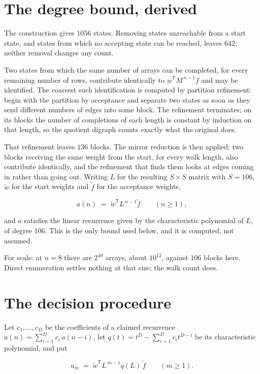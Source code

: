 \documentclass[11pt]{article}
\theoremstyle{definition}
\begin{document}
\section{The degree bound, derived}

The construction gives $1056$ states. Removing states unreachable from a start state, and states from which no accepting state can be reached, leaves $642$; neither removal changes any count.

Two states from which the same number of arrays can be completed, for every remaining number of rows, contribute identically to $w^{\mathsf T}M^{\,n-1}f$ and may be identified. The coarsest such identification is computed by partition refinement: begin with the partition by acceptance and separate two states as soon as they send different numbers of edges into some block. The refinement terminates; on its blocks the number of completions of each length is constant by induction on that length, so the quotient digraph counts exactly what the original does.

That refinement leaves $136$ blocks. The mirror reduction is then applied: two blocks receiving the same weight from the start, for every walk length, also contribute identically, and the refinement that finds them looks at edges coming in rather than going out. Writing $L$ for the resulting $S \times S$ matrix with $S = 106$, $\tilde w$ for the start weights and $\tilde f$ for the acceptance weights,

\[a(n) \;=\; \tilde w^{\mathsf T} L^{\,n-1} \tilde f \qquad (n \ge 1),\]

and $a$ satisfies the linear recurrence given by the characteristic polynomial of $L$, of degree $106$. This is the only bound used below, and it is computed, not assumed.

For scale: at $n = 8$ there are $2^{40}$ arrays, about $10^{12}$, against $106$ blocks here. Direct enumeration settles nothing at that size; the walk count does.

\section{The decision procedure}

Let $c_1,\dots,c_D$ be the coefficients of a claimed recurrence $a(n) = \sum_{i=1}^{D} c_i\,a(n-i)$, let $q(t) = t^{D} - \sum_{i=1}^{D} c_i t^{D-i}$ be its characteristic polynomial, and put

\[u_m \;=\; \tilde w^{\mathsf T} L^{\,m-1} q(L)\,\tilde f \qquad (m \ge 1).\]
\end{document}
